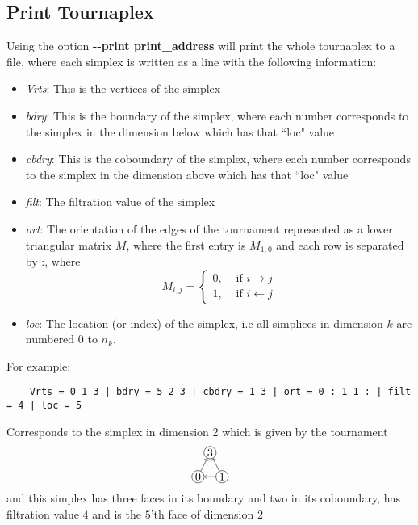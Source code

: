 \documentclass{amsart}
\theoremstyle{definition}
\begin{document}
\subsection{Print Tournaplex}
Using the option \textbf{-{}-print print\_address} will print the whole tournaplex to a file, where each simplex is written as a line with the following information:
  \begin{itemize}
    \item \emph{Vrts}: This is the vertices of the simplex
    \item \emph{bdry}: This is the boundary of the simplex, where each number corresponds to the simplex in the dimension below which has that ``loc" value
    \item \emph{cbdry}: This is the coboundary of the simplex, where each number corresponds to the simplex in the dimension above which has that ``loc" value
    \item \emph{filt}: The filtration value of the simplex
    \item \emph{ort}: The orientation of the edges of the tournament represented as a lower triangular matrix $M$, where the first entry is $M_{1,0}$ and each row is separated by :,
     where $$M_{i,j}=\begin{cases}0,&\mbox{ if }i\rightarrow j\\1,&\mbox{ if }i\leftarrow j\end{cases}$$
    \item \emph{loc}: The location (or index) of the simplex, i.e all simplices in dimension $k$ are numbered $0$ to $n_k$.
  \end{itemize}
  For example:
  \begin{verbatim}
    Vrts = 0 1 3 | bdry = 5 2 3 | cbdry = 1 3 | ort = 0 : 1 1 : | filt = 4 | loc = 5
  \end{verbatim}
  Corresponds to the simplex in dimension 2 which is given by the tournament $$\begin{tikzpicture}[scale=.75]
	\node[circle, draw=black,inner sep=1pt] (0) at (0,0){$0$};
	\node[circle, draw=black,inner sep=1pt] (1) at (1,0){$1$};
	\node[circle, draw=black,inner sep=1pt] (3) at (.5,1){$3$};
	\draw[->] (1) -- (0);
	\draw[->] (0) -- (3);
	\draw[->] (1) -- (3);
   \end{tikzpicture}$$
  and this simplex has three faces in its boundary and two in its coboundary, has filtration value $4$ and is the $5$'th face of dimension 2
\pagebreak
\end{document}

